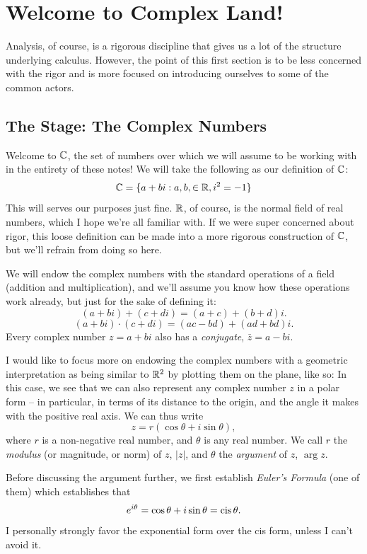 \section{Welcome to Complex Land!}
Analysis, of course, is a rigorous discipline that gives us a lot of the structure underlying calculus. However, the point of this first section is to be less concerned with the rigor and is more focused on introducing ourselves to some of the common actors.

\subsection{The Stage: The Complex Numbers}
Welcome to $\mathbb C$, the set of numbers over which we will assume to be working with in the entirety of these notes! We will take the following as our definition of $\mathbb C$:
\[
    \mathbb C = \{ a + b i : a, b, \in \mathbb R, i^2 = -1\}
\]
This will serves our purposes just fine. $\mathbb R$, of course, is the normal field of real numbers, which I hope we're all familiar with. If we were super concerned about rigor, this loose definition can be made into a more rigorous construction of $\mathbb C$, but we'll refrain from doing so here.

We will endow the complex numbers with the standard operations of a field (addition and multiplication), and we'll assume you know how these operations work already, but just for the sake of defining it:
\[(a + bi) + (c + di) = (a + c) + (b+ d) i.\]
\[(a + bi) \cdot (c + di) = (ac - bd) + (ad + bd)i. \]
Every complex number $z = a + bi$ also has a \textit{conjugate}, $\bar z = a - bi$.

I would like to focus more on endowing the complex numbers with a geometric interpretation as being similar to $\mathbb R^2$ by plotting them on the plane, like so:
In this case, we see that we can also represent any complex number $z$ in a polar form -- in particular, in terms of its distance to the origin, and the angle it makes with the positive real axis. We can thus write
\[
    z = r (\cos \theta + i \sin \theta),
\]
where $r$ is a non-negative real number, and $\theta$ is any real number. We call $r$ the \textit{modulus} (or magnitude, or norm) of $z$, $|z|$, and $\theta$ the \textit{argument} of $z$, $\arg z$.

Before discussing the argument further, we first establish \textit{Euler's Formula} (one of them) which establishes that
\[
    e^{i\theta} = \cos \theta + i \sin \theta = \operatorname{cis} \theta.
\]
I personally strongly favor the exponential form over the cis form, unless I can't avoid it.

